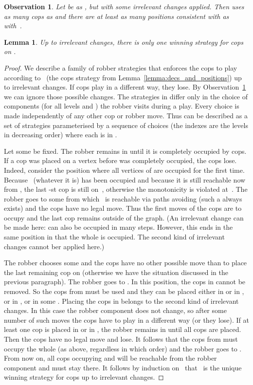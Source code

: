 \documentclass[authoryear]{article}
\newtheorem{lemma}[theorem]{Lemma}
\newtheorem{observation}[theorem]{Observation}
\theoremstyle{definition}
\newcommand{\0}{\emptyset}
\begin{document}
\begin{observation}\label{obs:irrelevant-changes}
Let  be as , but with some irrelevant changes applied.
Then  uses as many cops as  and there are at least as
many positions consistent with  as with~.
\end{observation}

\begin{lemma}\label{lemma:unique-sigma}
Up to irrelevant changes, there is only one winning strategy for 
cops on .
\end{lemma}
\begin{proof}
  We describe a family  of robber strategies that enforces the
  cops to play according to~ (the cops strategy from
  Lemma~\ref{lemma:decs_and_positions}) up to irrelevant changes. If
   cops play in a different way, they lose. By
  Observation~\ref{obs:irrelevant-changes} we can ignore those
  possible changes. The strategies in  differ only in the
  choice of components  (for all levels  and
  ) the robber visits during a play. Every
  choice is made independently of any other cop or robber move. Thus
   can be described as a set of strategies 
  parameterised by a sequence of choices
   (the indexes are the levels in
  decreasing order) where each  is in
  .

  Let some  be fixed.  The robber remains in  until it is completely
  occupied by cops. If a cop was placed on a vertex  before 
  was completely occupied, the cops lose. Indeed, consider the position where
  all vertices of  are occupied for the first time. Because~ (whatever
  it is) has been occupied and because it is still reachable now from ,
  the last -st cop is still on~, otherwise the monotonicity is
  violated at~. The robber goes to some  from which~ is reachable
  via paths avoiding  (such a  always exists) and the cops have no
  legal move. Thus the first moves of the cops are to occupy  and the last
  cop remains outside of the graph. (An irrelevant change can be made here:
   can also be occupied in many steps. However, this ends in the same
  position in that the whole  is occupied. The second kind of irrelevant
  changes cannot ber applied here.)

  The robber chooses some  and the cops have no other possible move
  than to place the last remaining cop on  (otherwise we have the
  situation discussed in the previous paragraph). The robber goes to
  . In this position, the cops in
   cannot be removed. So the cops from  must
  be used and they can be placed either in  or in ,
  or in , or in some . Placing the cops
  in  belongs to the second kind of irrelevant changes. In this case the
  robber component does not change, so after some number of such moves the cops
  have to play in a different way (or they lose). If at least one cop is placed
  in  or in , the robber
  remains in  until all cops are placed. Then the cops have no legal
  move and lose. It follows that the cops from  must occupy the whole
   (as above, regardless in which order) and the robber goes to
  . From now on, all cops occupying  and 
  will be reachable from the robber component and must stay there. It follows by
  induction on~ that~ is the unique winning strategy for  cops
  up to irrelevant changes.
\end{proof}
\end{document}
